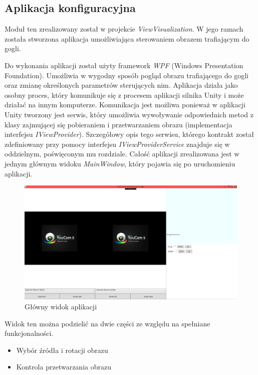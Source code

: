 \documentclass[a4paper,11pt,twoside]{report}
\theoremstyle{definition}
\begin{document}
\subsection {Aplikacja konfiguracyjna}

Moduł ten zrealizowany został w projekcie \textit{ViewVisualization}. W jego ramach została stworzona aplikacja umożliwiająca sterowaniem obrazem trafiającym do gogli.

Do wykonania aplikacji został użyty framework \textit{WPF} (Windows Presentation Foundation). Umożliwia w wygodny sposób pogląd obrazu trafiającego do gogli oraz zmianę określonych parametrów sterujących nim. Aplikacja działa jako osobny proces, który komunikuje się z procesem aplikacji silnika Unity i może działać na innym komputerze. Komunikacja jest możliwa ponieważ w aplikacji Unity tworzony jest serwis, który umożliwia wywoływanie odpowiednich metod z klasy zajmującej się pobieraniem i przetwarzaniem obrazu (implementacja interfejsu \textit{IViewProvider}). Szczegółowy opis tego serwisu, którego kontrakt został zdefiniowany przy pomocy interfejsu \textit{IViewProviderService} znajduje się w oddzielnym, poświęconym mu rozdziale. Całość aplikacji zrealizowana jest w jednym głównym widoku \textit{MainWindow}, który pojawia się po uruchomieniu aplikacji. 

\begin{figure}[h]
\centering
\includegraphics[scale=0.3]{mainwindow_screen}
\caption[Widok aplikacji]{Główny widok aplikacji}
\end{figure}

Widok ten można podzielić na dwie części ze względu na spełniane funkcjonalności. 

\begin{itemize}
\item Wybór źródła i rotacji obrazu
\item Kontrola przetwarzania obrazu
\end{itemize}
\end{document}
